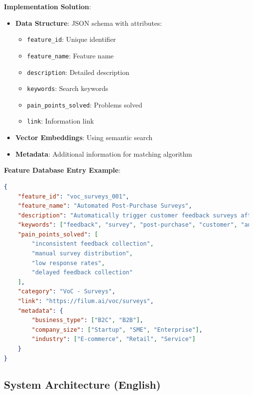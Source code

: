 \documentclass[12pt,a4paper]{article}
\begin{document}
\textbf{Implementation Solution}:
\begin{itemize}
    \item \textbf{Data Structure}: JSON schema with attributes:
    \begin{itemize}
        \item \texttt{feature\_id}: Unique identifier
        \item \texttt{feature\_name}: Feature name
        \item \texttt{description}: Detailed description
        \item \texttt{keywords}: Search keywords
        \item \texttt{pain\_points\_solved}: Problems solved
        \item \texttt{link}: Information link
    \end{itemize}
    \item \textbf{Vector Embeddings}: Using semantic search
    \item \textbf{Metadata}: Additional information for matching algorithm
\end{itemize}

\textbf{Feature Database Entry Example}:
\begin{lstlisting}[language=json, caption=Feature Database Schema Example]
{
    "feature_id": "voc_surveys_001",
    "feature_name": "Automated Post-Purchase Surveys",
    "description": "Automatically trigger customer feedback surveys after purchase transactions via email, SMS, or in-app notifications",
    "keywords": ["feedback", "survey", "post-purchase", "customer", "automation", "email", "sms"],
    "pain_points_solved": [
        "inconsistent feedback collection",
        "manual survey distribution",
        "low response rates",
        "delayed feedback collection"
    ],
    "category": "VoC - Surveys",
    "link": "https://filum.ai/voc/surveys",
    "metadata": {
        "business_type": ["B2C", "B2B"],
        "company_size": ["Startup", "SME", "Enterprise"],
        "industry": ["E-commerce", "Retail", "Service"]
    }
}
\end{lstlisting}

\subsection{System Architecture (English)}
\end{document}
